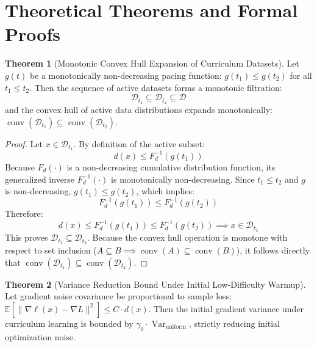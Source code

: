 \documentclass[11pt,a4paper]{article}
\theoremstyle{definition}
\newtheorem{theorem}{\textbf{Theorem}}[section]
\begin{document}
\section{Theoretical Theorems and Formal Proofs}

\begin{theorem}[Monotonic Convex Hull Expansion of Curriculum Datasets]
Let $g(t)$ be a monotonically non-decreasing pacing function: $g(t_1) \le g(t_2)$ for all $t_1 \le t_2$. Then the sequence of active datasets forms a monotonic filtration:
{\boldmath
\begin{equation}
\mathcal{D}_{t_1} \subseteq \mathcal{D}_{t_2} \subseteq \mathcal{D}
\end{equation}
}
and the convex hull of active data distributions expands monotonically: $\operatorname{conv}(\mathcal{D}_{t_1}) \subseteq \operatorname{conv}(\mathcal{D}_{t_2})$.
\end{theorem}

\begin{proof}
Let $x \in \mathcal{D}_{t_1}$. By definition of the active subset:
{\boldmath
\begin{equation}
d(x) \le F_d^{-1}(g(t_1))
\end{equation}
}
Because $F_d(\cdot)$ is a non-decreasing cumulative distribution function, its generalized inverse $F_d^{-1}(\cdot)$ is monotonically non-decreasing.
Since $t_1 \le t_2$ and $g$ is non-decreasing, $g(t_1) \le g(t_2)$, which implies:
{\boldmath
\begin{equation}
F_d^{-1}(g(t_1)) \le F_d^{-1}(g(t_2))
\end{equation}
}
Therefore:
{\boldmath
\begin{equation}
d(x) \le F_d^{-1}(g(t_1)) \le F_d^{-1}(g(t_2)) \implies x \in \mathcal{D}_{t_2}
\end{equation}
}
This proves $\mathcal{D}_{t_1} \subseteq \mathcal{D}_{t_2}$.
Because the convex hull operation is monotone with respect to set inclusion ($A \subseteq B \implies \operatorname{conv}(A) \subseteq \operatorname{conv}(B)$), it follows directly that $\operatorname{conv}(\mathcal{D}_{t_1}) \subseteq \operatorname{conv}(\mathcal{D}_{t_2})$.
\end{proof}

\begin{theorem}[Variance Reduction Bound Under Initial Low-Difficulty Warmup]
Let gradient noise covariance be proportional to sample loss: $\mathbb{E}[\|\nabla \ell(x) - \nabla L\|^2] \le C \cdot d(x)$. Then the initial gradient variance under curriculum learning is bounded by $\gamma_0 \cdot \operatorname{Var}_{\text{uniform}}$, strictly reducing initial optimization noise.
\end{theorem}
\end{document}
